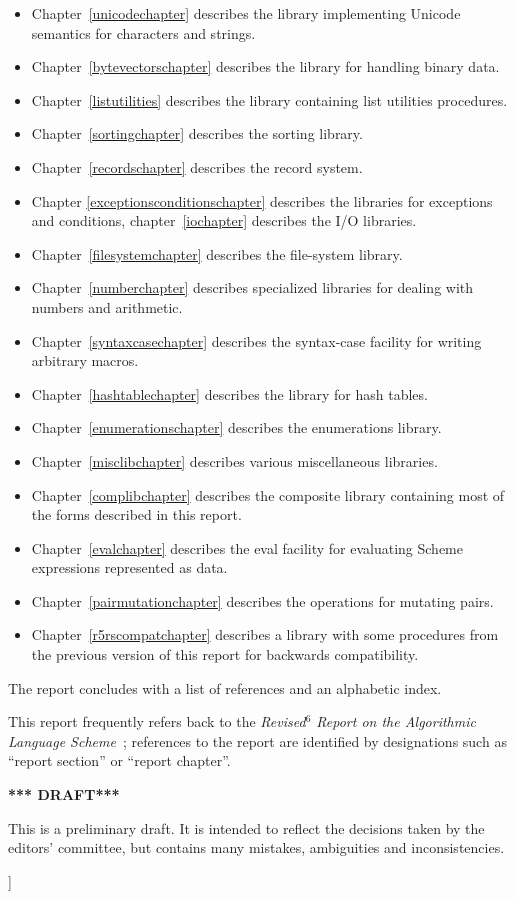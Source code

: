 \documentclass[twoside,twocolumn]{algol60}
\begin{document}
{\begin{itemize}
\item 
Chapter~\ref{unicodechapter} describes the library implementing Unicode
semantics for characters and strings.
\item Chapter~\ref{bytevectorschapter}
describes the library for handling binary data.
\item 
Chapter~\ref{listutilities} describes the library containing list utilities
procedures.
\item Chapter~\ref{sortingchapter} describes the sorting
library.
\item Chapter~\ref{recordschapter} describes the record system.
\item Chapter \ref{exceptionsconditionschapter} describes the libraries for
exceptions and conditions, chapter~\ref{iochapter} describes the I/O
libraries.
\item Chapter~\ref{filesystemchapter} describes the file-system library.
\item 
Chapter~\ref{numberchapter} describes specialized libraries
for dealing with numbers and arithmetic.
\item 
Chapter~\ref{syntaxcasechapter} describes the {\cf syntax-case}
facility for writing arbitrary macros.
\item Chapter~\ref{hashtablechapter}
describes the library for hash tables.
\item 
Chapter~\ref{enumerationschapter} describes the enumerations library.
\item
Chapter~\ref{misclibchapter} describes various miscellaneous libraries.
\item Chapter~\ref{complibchapter} describes the composite library
containing most of the forms described in this report.
\item 
Chapter~\ref{evalchapter} describes the {\cf eval} facility for
evaluating Scheme expressions represented as data.
\item 
Chapter~\ref{pairmutationchapter} describes the operations for
mutating pairs.
\item Chapter~\ref{r5rscompatchapter} describes a library
with some procedures from the previous
version of this report for backwards compatibility.
\end{itemize}

The report concludes with a list of references and an
alphabetic index.

This report frequently refers back to the \textit{Revised$^6$ Report
  on the Algorithmic Language Scheme}~\cite{R6RS}; references to the
report are identified by designations such as ``report section'' or
``report chapter''.

\bigskip

\begin{center}
{\large \bf
*** DRAFT*** \\
}\end{center}

This is a preliminary draft.  It is intended to reflect the decisions
taken by the editors' committee, but contains many mistakes,
ambiguities and inconsistencies.

}]
\end{document}
